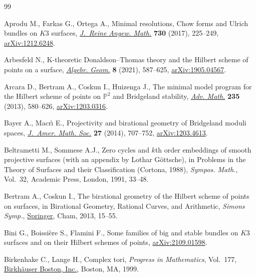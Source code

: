 \documentclass[pdftex]{sigma}
\numberwithin{equation}{section}
\begin{document}
\begin{thebibliography}{99}
\footnotesize\itemsep=0pt


Aprodu M., Farkas G., Ortega A., Minimal resolutions, {C}how forms and {U}lrich
 bundles on {$K3$} surfaces, \href{https://doi.org/10.1515/crelle-2014-0124}{\textit{J.~Reine Angew. Math.}} \textbf{730}
 (2017), 225--249, \href{https://arxiv.org/abs/1212.6248}{arXiv:1212.6248}.

Arbesfeld N., K-theoretic {D}onaldson--{T}homas theory and the {H}ilbert scheme
 of points on a surface, \href{https://doi.org/10.14231/ag-2021-018}{\textit{Algebr. Geom.}} \textbf{8} (2021), 587--625,
 \href{https://arxiv.org/abs/1905.04567}{arXiv:1905.04567}.

Arcara D., Bertram A., Coskun I., Huizenga J., The minimal model program for
 the {H}ilbert scheme of points on {$\mathbb{P}^2$} and {B}ridgeland
 stability, \href{https://doi.org/10.1016/j.aim.2012.11.018}{\textit{Adv. Math.}} \textbf{235} (2013), 580--626,
 \href{https://arxiv.org/abs/1203.0316}{arXiv:1203.0316}.

Bayer A., Macr\`{\i} E., Projectivity and birational geometry of {B}ridgeland
 moduli spaces, \href{https://doi.org/10.1090/S0894-0347-2014-00790-6}{\textit{J.~Amer. Math. Soc.}} \textbf{27} (2014), 707--752,
 \href{https://arxiv.org/abs/1203.4613}{arXiv:1203.4613}.

Beltrametti M., Sommese A.J., Zero cycles and {$k$}th order embeddings of
 smooth projective surfaces (with an appendix by Lothar G\"ottsche), in
 Problems in the Theory of Surfaces and their Classification ({C}ortona,
 1988), \textit{Sympos. Math.}, Vol.~32, Academic Press, London, 1991, 33--48.

Bertram A., Coskun I., The birational geometry of the {H}ilbert scheme of
 points on surfaces, in Birational Geometry, Rational Curves, and Arithmetic,
 \textit{Simons Symp.}, \href{https://doi.org/10.1007/978-1-4614-6482-2_2}{Springer}, Cham, 2013, 15--55.

Bini G., Boissi\`ere S., Flamini F., Some families of big and stable bundles on
 $K3$ surfaces and on their Hilbert schemes of points, \href{https://arxiv.org/abs/2109.01598}{arXiv:2109.01598}.

Birkenhake C., Lange H., Complex tori, \textit{Progress in Mathematics}, Vol.~177, \href{https://doi.org/10.1007/978-1-4612-1566-0}{Birkh\"auser Boston, Inc.}, Boston, MA, 1999.


\end{thebibliography}
\end{document}
